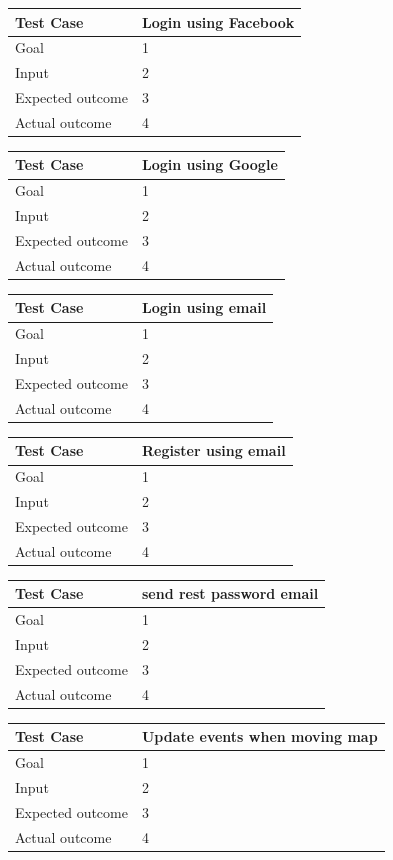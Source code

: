 \documentclass[a4paper]{scrreprt}
\begin{document}
\bigskip
\noindent
\begin{tabularx}{\linewidth}{|l|X|}
	\hline
	\textbf{Test Case} 	& \textbf{Login using Facebook} \\ \hline
	Goal 				& 1 \\ \hline
	Input 				& 2 \\ \hline
	Expected outcome 	& 3 \\ \hline
	Actual outcome 		& 4 \\ \hline
\end{tabularx}
\bigskip
\noindent
\begin{tabularx}{\linewidth}{|l|X|}
	\hline
	\textbf{Test Case} 	& \textbf{Login using Google} \\ \hline
	Goal 				& 1 \\ \hline
	Input 				& 2 \\ \hline
	Expected outcome 	& 3 \\ \hline
	Actual outcome 		& 4 \\ \hline
\end{tabularx}
\bigskip
\noindent
\begin{tabularx}{\linewidth}{|l|X|}
	\hline
	\textbf{Test Case} 	& \textbf{Login using email} \\ \hline
	Goal 				& 1 \\ \hline
	Input 				& 2 \\ \hline
	Expected outcome 	& 3 \\ \hline
	Actual outcome 		& 4 \\ \hline
\end{tabularx}
\bigskip
\noindent
\begin{tabularx}{\linewidth}{|l|X|}
	\hline
	\textbf{Test Case} 	& \textbf{Register using email} \\ \hline
	Goal 				& 1 \\ \hline
	Input 				& 2 \\ \hline
	Expected outcome 	& 3 \\ \hline
	Actual outcome 		& 4 \\ \hline
\end{tabularx}
\bigskip
\noindent
\begin{tabularx}{\linewidth}{|l|X|}
	\hline
	\textbf{Test Case} 	& \textbf{send rest password email} \\ \hline
	Goal 				& 1 \\ \hline
	Input 				& 2 \\ \hline
	Expected outcome 	& 3 \\ \hline
	Actual outcome 		& 4 \\ \hline
\end{tabularx}
\bigskip
\noindent
\begin{tabularx}{\linewidth}{|l|X|}
	\hline
	\textbf{Test Case} 	& \textbf{Update events when moving map} \\ \hline
	Goal 				& 1 \\ \hline
	Input 				& 2 \\ \hline
	Expected outcome 	& 3 \\ \hline
	Actual outcome 		& 4 \\ \hline
\end{tabularx}
\end{document}
